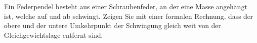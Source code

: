 Ein Federpendel besteht aus einer Schraubenfeder, an der eine Masse angehängt ist, welche auf und ab schwingt. Zeigen Sie mit einer formalen Rechnung, dass der obere und der untere Umkehrpunkt der Schwingung gleich weit von der Gleichgewichtslage entfernt sind.
